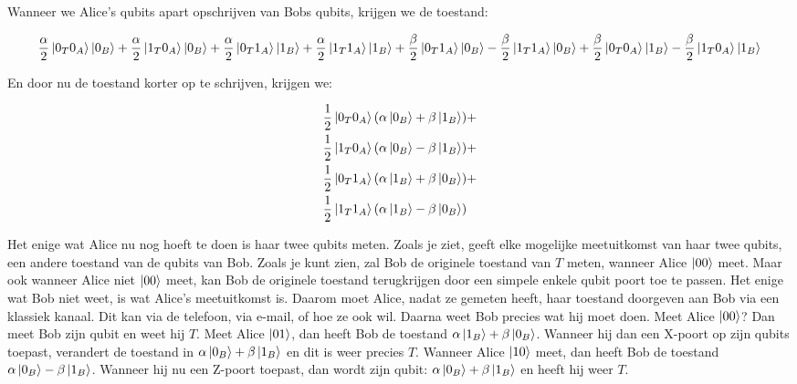 \documentclass[10pt, a4paper]{article}
\begin{document}
Wanneer we Alice's qubits apart opschrijven van Bobs qubits, krijgen we de toestand:

\begin{equation}
\frac{\alpha}{2}\ket{0_T0_A}\ket{0_B} +
\frac{\alpha}{2}\ket{1_T0_A}\ket{0_B} +
\frac{\alpha}{2}\ket{0_T1_A}\ket{1_B} +
\frac{\alpha}{2}\ket{1_T1_A}\ket{1_B} +
\frac{\beta}{2}\ket{0_T1_A}\ket{0_B} -
\frac{\beta}{2}\ket{1_T1_A}\ket{0_B} +
\frac{\beta}{2}\ket{0_T0_A}\ket{1_B} -
\frac{\beta}{2}\ket{1_T0_A}\ket{1_B}
\end{equation}

En door nu de toestand korter op te schrijven, krijgen we:

\begin{align*}
\frac{1}{2}\ket{0_T0_A}(\alpha\ket{0_B}&+\beta\ket{1_B}) +\\
\frac{1}{2}\ket{1_T0_A}(\alpha\ket{0_B} &- \beta\ket{1_B}) +\\
\frac{1}{2}\ket{0_T1_A}(\alpha\ket{1_B} &+ \beta\ket{0_B}) +\\
\frac{1}{2}\ket{1_T1_A}(\alpha\ket{1_B} &- \beta\ket{0_B})\\
\end{align*}

Het enige wat Alice nu nog hoeft te doen is haar twee qubits meten. Zoals je ziet, geeft elke mogelijke meetuitkomst van haar twee qubits, een andere toestand van de qubits van Bob. Zoals je kunt zien, zal Bob de originele toestand van $T$ meten, wanneer Alice $\ket{00}$ meet. Maar ook wanneer Alice niet $\ket{00}$ meet, kan Bob de originele toestand terugkrijgen door een simpele enkele qubit poort toe te passen. Het enige wat Bob niet weet, is wat Alice's meetuitkomst is. Daarom moet Alice, nadat ze gemeten heeft, haar toestand doorgeven aan Bob via een klassiek kanaal. Dit kan via de telefoon, via e-mail, of hoe ze ook wil. Daarna weet Bob precies wat hij moet doen. Meet Alice $\ket{00}$? Dan meet Bob zijn qubit en weet hij $T$. Meet Alice $\ket{01}$, dan heeft Bob de toestand $\alpha\ket{1_B} + \beta\ket{0_B}$. Wanneer hij dan een X-poort op zijn qubits toepast, verandert de toestand in $\alpha\ket{0_B} + \beta\ket{1_B}$ en dit is weer precies $T$. Wanneer Alice $\ket{10}$ meet, dan heeft Bob de toestand $\alpha\ket{0_B} - \beta\ket{1_B}$. Wanneer hij nu een Z-poort toepast, dan wordt zijn qubit: $\alpha\ket{0_B} + \beta\ket{1_B}$ en heeft hij weer $T$.
\end{document}
